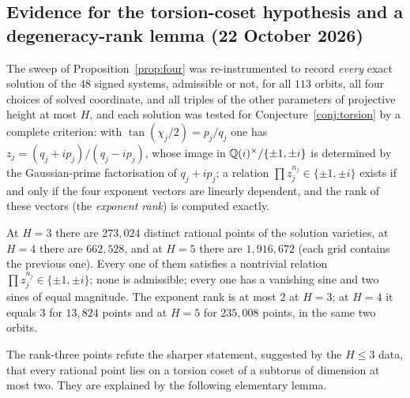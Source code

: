 \subsection{Evidence for the torsion-coset hypothesis and a degeneracy-rank lemma (22 October 2026)}\label{sec:torsionprobe}
The sweep of Proposition~\ref{prop:four} was re-instrumented to record \emph{every} exact solution of the $48$ signed systems, admissible or not, for all $113$ orbits, all four choices of solved coordinate, and all triples of the other parameters of projective height at most $H$, and each solution was tested for Conjecture~\ref{conj:torsion} by a complete criterion: with $\tan(\chi_j/2)=p_j/q_j$ one has $z_j=(q_j+ip_j)/(q_j-ip_j)$, whose image in $\mathbb Q(i)^\times/\{\pm1,\pm i\}$ is determined by the Gaussian-prime factorisation of $q_j+ip_j$; a relation $\prod z_j^{n_j}\in\{\pm1,\pm i\}$ exists if and only if the four exponent vectors are linearly dependent, and the rank of these vectors (the \emph{exponent rank}) is computed exactly.

\begin{proposition}\label{prop:torsiondata}
At $H=3$ there are $273{,}024$ distinct rational points of the solution varieties, at $H=4$ there are $662{,}528$, and at $H=5$ there are $1{,}916{,}672$ (each grid contains the previous one). Every one of them satisfies a nontrivial relation $\prod z_j^{n_j}\in\{\pm1,\pm i\}$; none is admissible; every one has a vanishing sine and two sines of equal magnitude. The exponent rank is at most $2$ at $H=3$; at $H=4$ it equals $3$ for $13{,}824$ points and at $H=5$ for $235{,}008$ points, in the same two orbits.
\end{proposition}
The rank-three points refute the sharper statement, suggested by the $H\le3$ data, that every rational point lies on a torsion coset of a subtorus of dimension at most two. They are explained by the following elementary lemma.

